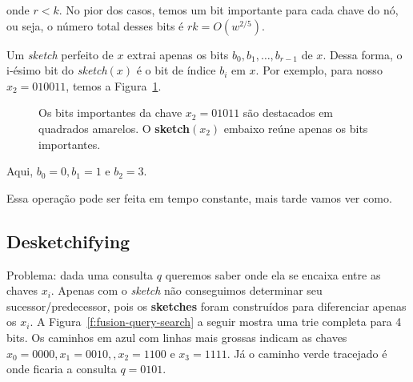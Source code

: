 onde $r<k$. No pior dos casos, temos um bit importante para cada chave do nó, ou
seja, o número total desses bits é $rk = O(w^{2/5})$. 

Um \textit{sketch} perfeito de $x$ extrai apenas os bits $b_0,b_1,\dots,
b_{r-1}$ de $x$. Dessa forma, o i-ésimo bit do \textit{sketch}$(x)$ é o bit de
índice $b_i$ em $x$. Por exemplo, para nosso $x_2=010011$, temos a
Figura~\ref{f:fusion-sketch}.

\begin{figure}[h]
\centering
{}
\caption{Os bits importantes da chave $x_2=01011$ são destacados em quadrados
amarelos. O \textbf{sketch}$(x_2)$ embaixo reúne apenas os bits
importantes.\label{f:fusion-sketch}}
\end{figure}

Aqui, $b_0=0,b_1=1$ e $b_2=3$.

Essa operação pode ser feita em tempo constante, mais tarde vamos ver como.

\subsection{Desketchifying}

Problema: dada uma consulta $q$ queremos saber onde ela se encaixa entre as
chaves $x_i$. Apenas com o \textit{sketch} não conseguimos determinar seu
sucessor/predecessor, pois os \textbf{sketches} foram construídos para
diferenciar apenas os $x_i$. A Figura~\ref{f:fusion-query-search} a seguir
mostra uma trie completa para 4 bits. Os caminhos em azul com linhas mais
grossas indicam as chaves $x_0=0000,x_1=0010,,x_2=1100$ e $x_3=1111$. Já o
caminho verde tracejado é onde ficaria a consulta $q=0101$.

